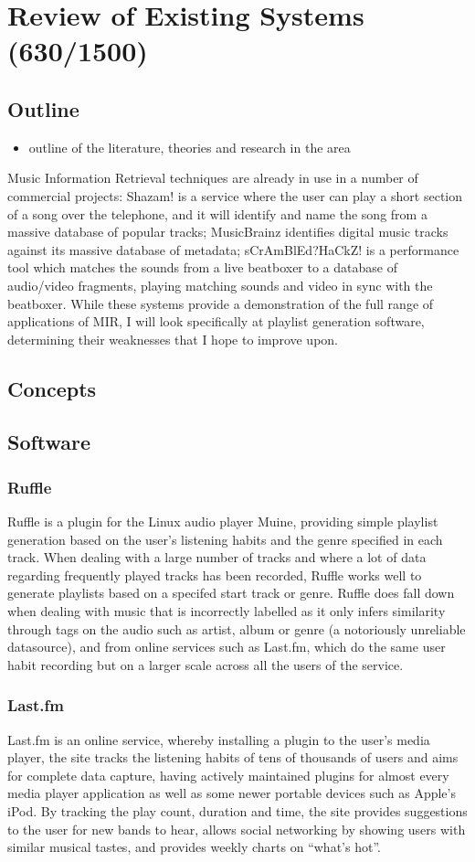 \chapter{Review of Existing Systems (630/1500)}
\section{Outline}
\begin{itemize}
	\item outline of the literature, theories and research in the area
\end{itemize}
Music Information Retrieval techniques are already in use in a number of commercial projects: Shazam! is a service where the user can play a short section of a song over the telephone, and it will identify and name the song from a massive database of popular tracks; MusicBrainz identifies digital music tracks against its massive database of metadata; sCrAmBlEd?HaCkZ! is a performance tool which matches the sounds from a live beatboxer to a database of audio/video fragments, playing matching sounds and video in sync with the beatboxer. While these systems provide a demonstration of the full range of applications of MIR, I will look specifically at playlist generation software, determining their weaknesses that I hope to improve upon.
\section{Concepts}
\section{Software}
\subsection{Ruffle}
Ruffle is a plugin for the Linux audio player Muine, providing simple playlist generation based on the user's listening habits and the genre specified in each track. When dealing with a large number of tracks and where a lot of data regarding frequently played tracks has been recorded, Ruffle works well to generate playlists based on a specifed start track or genre. Ruffle does fall down when dealing with music that is incorrectly labelled as it only infers similarity through tags on the audio such as artist, album or genre (a notoriously unreliable datasource), and from online services such as Last.fm, which do the same user habit recording but on a larger scale across all the users of the service.
\subsection{Last.fm}
Last.fm is an online service, whereby installing a plugin to the user's media player, the site tracks the listening habits of tens of thousands of users and aims for complete data capture, having actively maintained plugins for almost every media player application as well as some newer portable devices such as Apple's iPod. By tracking the play count, duration and time, the site provides suggestions to the user for new bands to hear, allows social networking by showing users with similar musical tastes, and provides weekly charts on ``what's hot''.
